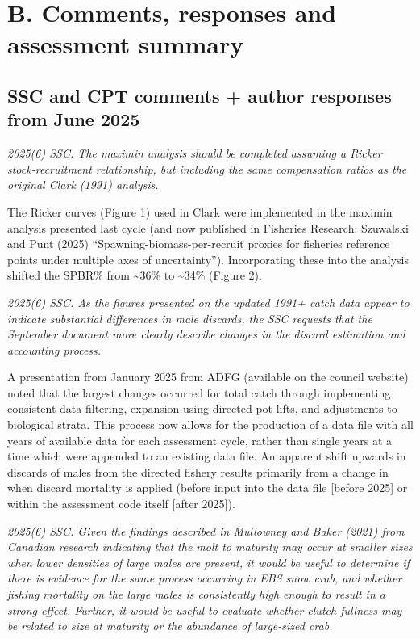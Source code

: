 \documentclass[
]{article}
\begin{document}
\section{B. Comments, responses and assessment summary}\label{b.-comments-responses-and-assessment-summary}

\subsection{SSC and CPT comments + author responses from June 2025}\label{ssc-and-cpt-comments-author-responses-from-june-2025}

\emph{2025(6) SSC. The maximin analysis should be completed assuming a Ricker stock-recruitment relationship, but including the same compensation ratios as the original Clark (1991) analysis.}

The Ricker curves (Figure 1) used in Clark were implemented in the maximin analysis presented last cycle (and now published in Fisheries Research: Szuwalski and Punt (2025) ``Spawning-biomass-per-recruit proxies for fisheries reference points under multiple axes of uncertainty''). Incorporating these into the analysis shifted the SPBR\% from \textasciitilde36\% to \textasciitilde34\% (Figure 2).

\emph{2025(6) SSC. As the figures presented on the updated 1991+ catch data appear to indicate substantial differences in male discards, the SSC requests that the September document more clearly describe changes in the discard estimation and accounting process.}

A presentation from January 2025 from ADFG (available on the council website) noted that the largest changes occurred for total catch through implementing consistent data filtering, expansion using directed pot lifts, and adjustments to biological strata. This process now allows for the production of a data file with all years of available data for each assessment cycle, rather than single years at a time which were appended to an existing data file. An apparent shift upwards in discards of males from the directed fishery results primarily from a change in when discard mortality is applied (before input into the data file {[}before 2025{]} or within the assessment code itself {[}after 2025{]}).

\emph{2025(6) SSC. Given the findings described in Mullowney and Baker (2021) from Canadian research indicating that the molt to maturity may occur at smaller sizes when lower densities of large males are present, it would be useful to determine if there is evidence for the same process occurring in EBS snow crab, and whether fishing mortality on the large males is consistently high enough to result in a strong effect. Further, it would be useful to evaluate whether clutch fullness may be related to size at maturity or the abundance of large-sized crab.}
\end{document}
